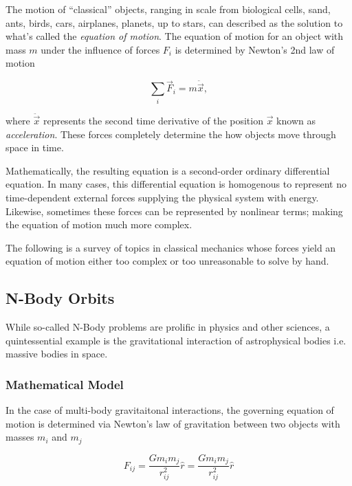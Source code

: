 \documentclass{report}
\begin{document}
    The motion of ``classical'' objects, ranging in scale from biological cells, sand, ants, birds, cars, airplanes, planets, up to stars, can described as the solution to what's called the \emph{equation of motion}.  The equation of motion for an object with mass $m$ under the influence of forces $F_i$ is determined by Newton's 2nd law of motion
    
    \begin{equation} \label{eq:newton}
        \sum_i \vec{F}_i = m \ddot{\vec{x}},
    \end{equation}

    where $\ddot{\vec{x}}$ represents the second time derivative of the position $\vec{x}$ known as \emph{acceleration}.  These forces completely determine the how objects move through space in time.
    
    Mathematically, the resulting equation is a second-order ordinary differential equation.  In many cases, this differential equation is homogenous to represent no time-dependent external forces supplying the physical system with energy.  Likewise, sometimes these forces can be represented by nonlinear terms; making the equation of motion much more complex.
    
    The following is a survey of topics in classical mechanics whose forces yield an equation of motion either too complex or too unreasonable to solve by hand.

    \subsection{N-Body Orbits} \label{subsec:orbits}

        While so-called N-Body problems are prolific in physics and other sciences, a quintessential example is the gravitational interaction of astrophysical bodies i.e. massive bodies in space.

        \subsubsection{Mathematical Model}

            In the case of multi-body gravitaitonal interactions, the governing equation of motion is determined via Newton's law of gravitation between two objects with masses $m_i$ and $m_j$

            \begin{equation}
                F_{ij} = \frac{G m_i m_j}{r_{ij}^2} \hat{r} = \frac{G m_i m_j}{r_{ij}^2} \hat{r}
            \end{equation}
\end{document}
